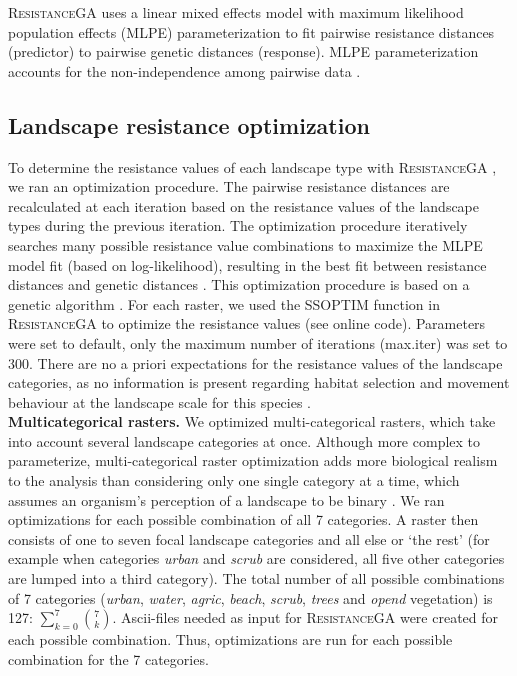 \documentclass[10pt, twoside]{book} %
\begin{document}
		\textsc{ResistanceGA} uses a linear mixed effects model with maximum likelihood population effects (MLPE) parameterization to fit pairwise resistance distances (predictor) to pairwise genetic distances (response). MLPE parameterization accounts for the non-independence among pairwise data \citep{clarke2002, bates2015}.\\
		
		
		\subsection{Landscape resistance optimization}
		To determine the resistance values of each landscape type with \textsc{ResistanceGA} \citep{peterman2018}, we ran an optimization procedure. The pairwise resistance distances are recalculated at each iteration based on the resistance values of the landscape types during the previous iteration. The optimization procedure iteratively searches many possible resistance value combinations to maximize the MLPE model fit (based on log-likelihood), resulting in the best fit between resistance distances and genetic distances \citep{peterman2018}. This optimization procedure is based on a genetic algorithm \citep{scrucca2013}. For each raster, we used the SS\textunderscore OPTIM function in \textsc{ResistanceGA} to optimize the resistance values (see online code). Parameters were set to default, only the maximum number of iterations (max.iter) was set to 300. There are no a priori expectations for the resistance values of the landscape categories, as no information is present regarding habitat selection and movement behaviour at the landscape scale for this species \citep{knowlton2010}.\\
		
		\noindent \textbf{Multicategorical rasters.} We optimized multi-categorical rasters, which take into account several landscape categories at once. Although more complex to parameterize, multi-categorical raster optimization adds more biological realism to the analysis than considering only one single category at a time, which assumes an organism's perception of a landscape to be binary \citep{spear2010}. We ran optimizations for each possible combination of all 7 categories. A raster then consists of one to seven focal landscape categories and all else or `the rest' (for example when categories \textit{urban} and \textit{scrub} are considered, all five other categories are lumped into a third category). The total number of all possible combinations of 7 categories (\textit{urban}, \textit{water}, \textit{agric}, \textit{beach}, \textit{scrub}, \textit{trees} and \textit{opend} vegetation) is 127: $ \sum_{k=0}^{7}{7 \choose k}$. Ascii-files needed as input for \textsc{ResistanceGA} were created for each possible combination. Thus, optimizations are run for each possible combination for the 7 categories.\\
		
\end{document}
